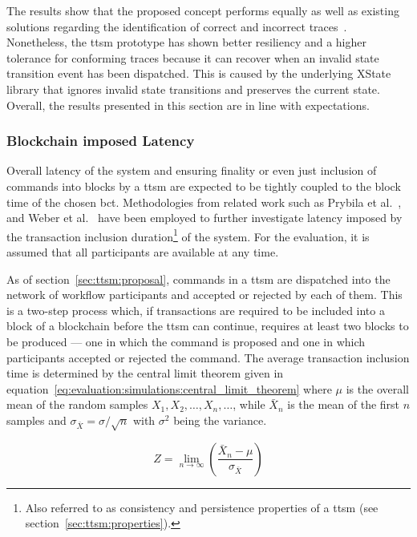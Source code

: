 The results show that the proposed concept performs equally as well as existing solutions regarding the identification of correct and incorrect traces~\cite{untrusted_bp_execution_using_blockchain,interpreted_bp_on_blockchain_loukil}. Nonetheless, the \gls{ttsm} prototype has shown better resiliency and a higher tolerance for conforming traces because it can recover when an invalid state transition event has been dispatched. This is caused by the underlying XState library that ignores invalid state transitions and preserves the current state. Overall, the results presented in this section are in line with expectations.

\subsubsection{Blockchain imposed Latency}
\label{sec:evaluation:simulations:execution_duration}
Overall latency of the system and ensuring finality or even just inclusion of commands into blocks by a \gls{ttsm} are expected to be tightly coupled to the block time of the chosen \gls{bct}. Methodologies from related work such as Prybila et al.~\cite{runtime_verification_for_bp_utilizing_bitcoin}, and Weber et al.~\cite{untrusted_bp_execution_using_blockchain} have been employed to further investigate latency imposed by the transaction inclusion duration\footnote{Also referred to as consistency and persistence properties of a \gls{ttsm} (see section~\ref{sec:ttsm:properties}).} of the system. For the evaluation, it is assumed that all participants are available at any time.

As of section~\ref{sec:ttsm:proposal}, commands in a \gls{ttsm} are dispatched into the network of workflow participants and accepted or rejected by each of them. This is a two-step process which, if transactions are required to be included into a block of a blockchain before the \gls{ttsm} can continue, requires at least two blocks to be produced --- one in which the command is proposed and one in which participants accepted or rejected the command. The average transaction inclusion time is determined by the central limit theorem given in equation~\ref{eq:evaluation:simulations:central_limit_theorem} where $\mu$ is the overall mean of the random samples $X_1,X_2,\ldots,X_n,\ldots$, while $\bar{X}_{n}$ is the mean of the first $n$ samples and $\sigma_{\bar{X}}=\sigma/\sqrt{n}$ with $\sigma^2$ being the variance.

\begin{equation}
\label{eq:evaluation:simulations:central_limit_theorem}
Z=\lim_{n \to \infty}\left(\frac{\bar{X}_{n} - \mu}{\sigma_{\bar{X}}}\right)
\end{equation}

